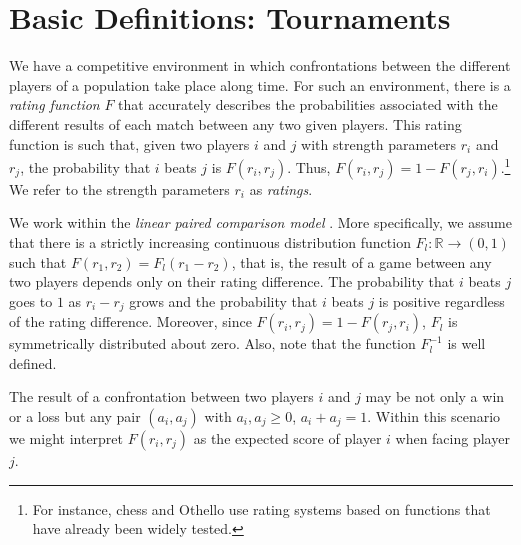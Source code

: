 \documentclass[a4paper,10pt]{article}
\theoremstyle{remark}
\newcommand{\rv}{r} %
\begin{document}
\section{Basic Definitions: Tournaments}\label{scTournaments}

We have a competitive environment in which confrontations between
the different players of a population take place along time. For
such an environment, there is a \emph{rating function} $F$ that
accurately describes the probabilities associated with the
different results of each match between any two given players.
This rating function is such that, given two players $i$ and $j$
with strength parameters $\rv_i$ and $\rv_j$, the probability that
$i$ beats $j$ is $F(\rv_i,\rv_j)$. Thus,
$F(\rv_i,\rv_j)=1-F(\rv_j,\rv_i)$.\footnote{For instance, chess
and Othello use rating systems based on functions that have
already been widely tested.} We refer to the strength parameters
$\rv_i$ as \emph{ratings}.

We work within the \emph{linear paired comparison model}
\citep{David:1988}. More specifically, we assume that there is a
strictly increasing continuous distribution function $F_l:\mathbb
R\to (0,1)$ such that $F(\rv_1,\rv_2)=F_l(\rv_1-\rv_2)$, that is,
the result of a game between any two players depends only on their
rating difference. The probability that $i$ beats $j$ goes to $1$
as $\rv_i-\rv_j$ grows and the probability that $i$ beats $j$ is
positive  regardless of the rating difference. Moreover, since
$F(\rv_i,\rv_j)=1-F(\rv_j,\rv_i)$, $F_l$ is symmetrically
distributed about zero. Also, note that the function $F_l^{-1}$ is
well defined.%

The result of a confrontation between two players $i$ and $j$ may
be not only a win or a loss but any pair $(a_i,a_j)$ with $a_i,a_j\geq
0$, $a_i+a_j=1$. Within this scenario we might interpret $F(\rv_i,\rv_j)$ as the
expected score of player $i$ when facing player $j$.
\end{document}
